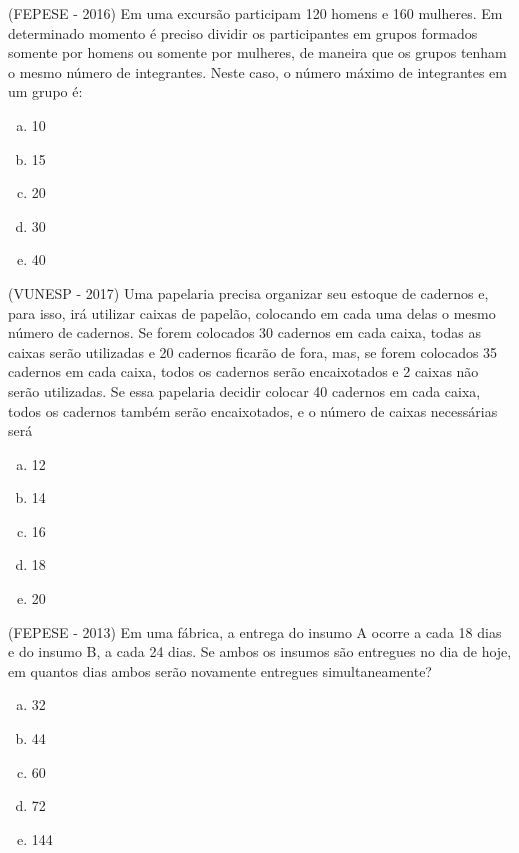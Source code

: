  \begin{exer}
 (FEPESE - 2016) Em uma excursão participam 120 homens e 160 mulheres. Em determinado momento é preciso dividir os participantes em grupos formados somente por homens ou somente por mulheres, de maneira que os grupos tenham o mesmo número de integrantes. Neste caso, o número máximo de integrantes em um grupo é:
  \begin{enumerate}[a)]
  \item 10
  \item 15
  \item 20
  \item 30
  \item 40
  \end{enumerate}
 \end{exer}
 
 \begin{exer}
 (VUNESP - 2017) Uma papelaria precisa organizar seu estoque de cadernos e, para isso, irá utilizar caixas de papelão, colocando em cada uma delas o mesmo número de cadernos. Se forem colocados 30 cadernos em cada caixa, todas as caixas serão utilizadas e 20 cadernos ficarão de fora, mas, se forem colocados 35 cadernos em cada caixa, todos os cadernos serão encaixotados e 2 caixas não serão utilizadas. Se essa papelaria decidir colocar 40 cadernos em cada caixa, todos os cadernos também serão encaixotados, e o número de caixas necessárias será
  \begin{enumerate}[a)]
  \item 12
  \item 14
  \item 16
  \item 18
  \item 20
  \end{enumerate}
 \end{exer}
 
 \begin{exer}
 (FEPESE - 2013) Em uma fábrica, a entrega do insumo A ocorre a cada 18 dias e do insumo B, a cada 24 dias. Se ambos os insumos são entregues no dia de hoje, em quantos dias ambos serão novamente entregues simultaneamente?
  \begin{enumerate}[a)]
  \item 32
  \item 44
  \item 60
  \item 72
  \item 144
  \end{enumerate}
 \end{exer}
 
